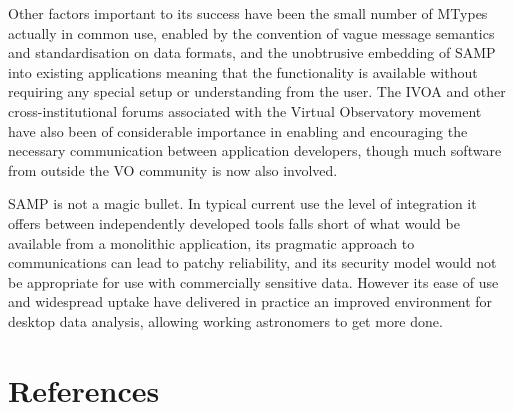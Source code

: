 \documentclass[5p]{elsarticle}
\begin{document}
Other factors important to its success have been
the small number of MTypes actually in common use,
enabled by the convention of vague message semantics
and standardisation on data formats,
and the unobtrusive embedding of SAMP into existing applications
meaning that the functionality is available without
requiring any special setup or understanding from the user.
The IVOA and other cross-institutional forums associated with
the Virtual Observatory movement have also been of considerable
importance in enabling and encouraging the necessary communication
between application developers, though much software from outside
the VO community is now also involved.

SAMP is not a magic bullet.
In typical current use the level of integration it offers
between independently developed tools falls short of what would be
available from a monolithic application,
its pragmatic approach to communications can lead to patchy reliability,
and its security model would not be appropriate for use with
commercially sensitive data.
However its ease of use and widespread uptake have delivered in practice
an improved environment for desktop data analysis,
allowing working astronomers to get more done.



\section*{References}


\end{document}

